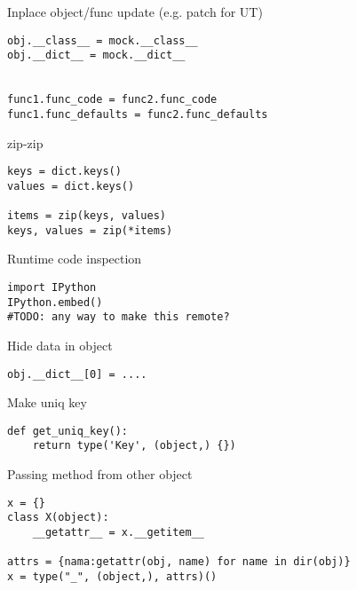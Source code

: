 \documentclass{article}
\begin{document}
\LARGE

\begin{center} Inplace object/func update (e.g. patch for UT) \end{center}
\begin{lstlisting}
obj.__class__ = mock.__class__
obj.__dict__ = mock.__dict__


func1.func_code = func2.func_code
func1.func_defaults = func2.func_defaults
\end{lstlisting}
\newpage

\begin{center} zip-zip \end{center}
\begin{lstlisting}
keys = dict.keys()
values = dict.keys()

items = zip(keys, values)
keys, values = zip(*items)
\end{lstlisting}
\newpage

\begin{center} Runtime code inspection \end{center}
\begin{lstlisting}
import IPython
IPython.embed()
#TODO: any way to make this remote?
\end{lstlisting}
\newpage

\begin{center} Hide data in object\end{center}
\begin{lstlisting}
obj.__dict__[0] = ....
\end{lstlisting}
\newpage

\begin{center} Make uniq key \end{center}
\begin{lstlisting}
def get_uniq_key():
    return type('Key', (object,) {})
\end{lstlisting}
\newpage

\begin{center} Passing method from other object \end{center}
\begin{lstlisting}
x = {}
class X(object):
    __getattr__ = x.__getitem__

attrs = {nama:getattr(obj, name) for name in dir(obj)}
x = type("_", (object,), attrs)()
\end{lstlisting}
\end{document}
